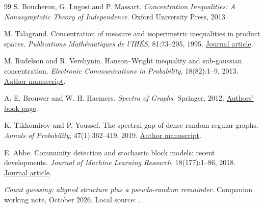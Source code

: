 \documentclass[11pt,a4paper]{article}
\theoremstyle{definition}
\theoremstyle{remark}
\begin{document}
\begin{thebibliography}{99}
S. Boucheron, G. Lugosi and P. Massart.
\emph{Concentration Inequalities: A Nonasymptotic Theory of Independence}.
Oxford University Press, 2013.

M. Talagrand.
Concentration of measure and isoperimetric inequalities in product spaces.
\emph{Publications Math\'ematiques de l'IH\'ES}, 81:73--205, 1995.
\href{https://pmihes.centre-mersenne.org/articles/10.1007/BF02699376/}{Journal article}.

M. Rudelson and R. Vershynin. Hanson--Wright inequality and sub-gaussian
concentration. \emph{Electronic Communications in Probability}, 18(82):1--9, 2013.
\href{https://arxiv.org/abs/1306.2872}{Author manuscript}.

A. E. Brouwer and W. H. Haemers. \emph{Spectra of Graphs}. Springer, 2012.
\href{https://homepages.cwi.nl/~aeb/math/ipm/}{Authors' book page}.

K. Tikhomirov and P. Youssef. The spectral gap of dense random regular graphs.
\emph{Annals of Probability}, 47(1):362--419, 2019.
\href{https://arxiv.org/abs/1610.01765}{Author manuscript}.

E. Abbe. Community detection and stochastic block models: recent developments.
\emph{Journal of Machine Learning Research}, 18(177):1--86, 2018.
\href{https://jmlr.org/papers/v18/16-480.html}{Journal article}.

\emph{Count guessing: aligned structure plus a pseudo-random remainder}.
Companion working note, October 2026.
Local source: .
\end{thebibliography}
\end{document}
